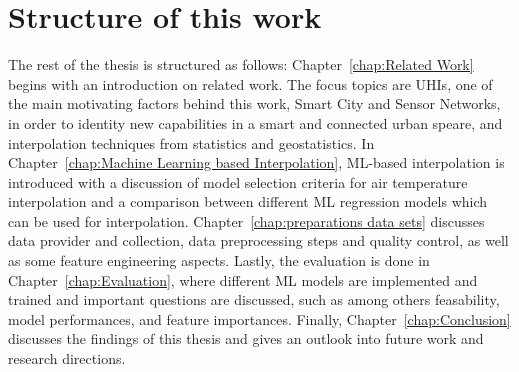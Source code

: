 \section{Structure of this work}

The rest of the thesis is structured as follows: Chapter~\ref{chap:Related Work} begins with an introduction on related work. The focus topics are UHIs, one of the main motivating factors behind this work, Smart City and Sensor Networks, in order to identity new capabilities in a smart and connected urban speare, and interpolation techniques from statistics and geostatistics. In Chapter~\ref{chap:Machine Learning based Interpolation}, ML-based interpolation is introduced with a discussion of model selection criteria for air temperature interpolation and a comparison between different ML regression models which can be used for interpolation. Chapter~\ref{chap:preparations data sets} discusses data provider and collection, data preprocessing steps and quality control, as well as some feature engineering aspects. Lastly, the evaluation is done in Chapter~\ref{chap:Evaluation}, where different ML models are implemented and trained and important questions are discussed, such as among others feasability, model performances, and feature importances. Finally, Chapter~\ref{chap:Conclusion} discusses the findings of this thesis and gives an outlook into future work and research directions.
